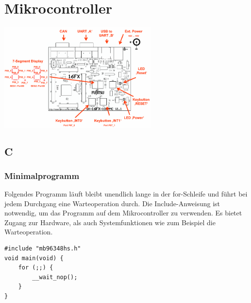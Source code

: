 \documentclass[
  accentcolor=tud1c,	%
  colorbacktitle,		%
  inverttitle,			%
  german,
  twoside
]{tudreport}
\begin{document}
\chapter{Mikrocontroller}

\begin{center}
	\includegraphics[width=0.6\textwidth]{figures/starterkit.png}
\end{center}


\section{C}
\subsection{Minimalprogramm}
Folgendes Programm läuft bleibt unendlich lange in der for-Schleife und führt bei jedem Durchgang eine Warteoperation durch.
Die Include-Anweisung ist notwendig, um das Programm auf dem Mikrocontroller zu verwenden.
Es bietet Zugang zur Hardware, als auch Systemfunktionen wie zum Beispiel die Warteoperation.
\begin{lstlisting}
#include "mb96348hs.h"
void main(void) {
	for (;;) {
		__wait_nop();
	}
}
\end{lstlisting}
\end{document}

